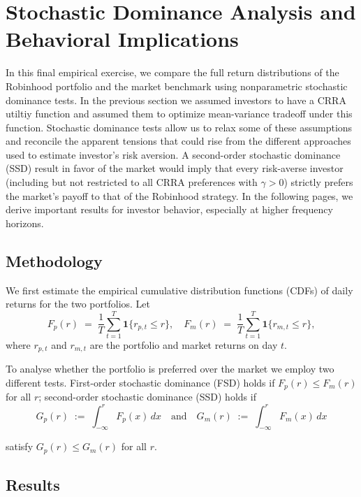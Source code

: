 \section{Stochastic Dominance Analysis and Behavioral Implications}

In this final empirical exercise, we compare the full return distributions of the Robinhood portfolio and the market benchmark using nonparametric stochastic dominance tests.
In the previous section we assumed investors to have a CRRA utiltiy function and assumed them to optimize mean-variance tradeoff under this function.
Stochastic dominance tests allow us to relax some of these assumptions and reconcile the apparent tensions that could rise from the different approaches used to estimate investor's risk aversion.  
A second-order stochastic dominance (SSD) result in favor of the market would imply that every risk-averse investor 
(including but not restricted to all CRRA preferences with $\gamma>0$) strictly prefers the market's payoff to that of the Robinhood strategy.
In the following pages, we derive important results for investor behavior, especially at higher frequency horizons. 

\subsection{Methodology}
We first estimate the empirical cumulative distribution functions (CDFs) of daily returns for the two portfolios.  Let
\begin{equation}    
    F_{p}(r) \;=\; \frac{1}{T}\sum_{t=1}^{T}\mathbf{1}\{r_{p,t}\le r\},
    \quad
    F_{m}(r) \;=\; \frac{1}{T}\sum_{t=1}^{T}\mathbf{1}\{r_{m,t}\le r\},
\end{equation}
where $r_{p,t}$ and $r_{m,t}$ are the portfolio and market returns on day $t$.  

To analyse whether the portfolio is preferred over the market we employ two different tests.
First-order stochastic dominance (FSD) holds if $F_{p}(r)\le F_{m}(r)$ for all $r$; 
second-order stochastic dominance (SSD) holds if
\begin{equation}    
    G_{p}(r) \;:=\;\int_{-\infty}^{r}F_{p}(x)\,dx
    \quad\text{and}\quad
    G_{m}(r)\;:=\;\int_{-\infty}^{r}F_{m}(x)\,dx
\end{equation}

satisfy $G_{p}(r)\le G_{m}(r)$ for all $r$.


\subsection{Results}
